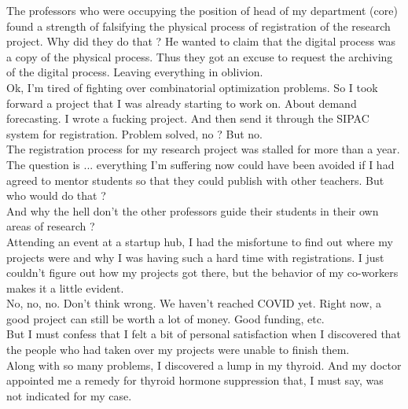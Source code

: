 \documentclass[11pt]{book}
\begin{document}
\noindent The professors who were occupying the position of head of my department (core) found a strength of falsifying the physical process of registration of the research project. Why did they do that ? He wanted to claim that the digital process was a copy of the physical process. Thus they got an excuse to request the archiving of the digital process. Leaving everything in oblivion. \\

\noindent Ok, I'm tired of fighting over combinatorial optimization problems. So I took forward a project that I was already starting to work on. About demand forecasting. I wrote a fucking project. And then send it through the SIPAC system for registration. Problem solved, no ? But no.\\

\noindent The registration process for my research project was stalled for more than a year. \\

\noindent The question is ... everything I'm suffering now could have been avoided if I had agreed to mentor students so that they could publish with other teachers. But who would do that ? \\

\noindent And why the hell don't the other professors guide their students in their own areas of research ? \\

\noindent Attending an event at a startup hub, I had the misfortune to find out where my projects were and why I was having such a hard time with registrations. I just couldn't figure out how my projects got there, but the behavior of my co-workers makes it a little evident. \\

\noindent No, no, no. Don't think wrong. We haven't reached COVID yet. Right now, a good project can still be worth a lot of money. Good funding, etc. \\

\noindent But I must confess that I felt a bit of personal satisfaction when I discovered that the people who had taken over my projects were unable to finish them. \\

\noindent Along with so many problems, I discovered a lump in my thyroid. And my doctor appointed me a remedy for thyroid hormone suppression that, I must say, was not indicated for my case. \\
\end{document}
